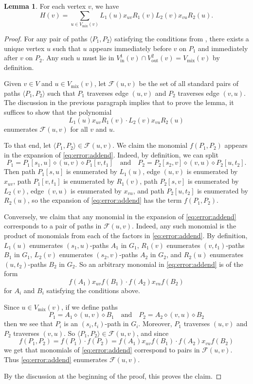 \documentclass[11pt]{article}
\newcommand{\grp}[1]{\left(#1\right)}
\newcommand{\pair}[1]{\langle #1\rangle}
\newcommand{\dia}{\diamond}
\newcommand{\ca}{\mathcal}
\renewcommand{\t}{\text}
\newcommand{\vin}{V_{\t{in}}}
\newcommand{\vout}{V_{\t{out}}}
\newcommand{\vmix}{V_{\t{mix}}}
\theoremstyle{definition}
\newtheorem{lemma}[theorem]{Lemma}
\begin{document}
\begin{lemma}
\label{lem:error-computation}
    For each vertex $v$, we have 
    \[H(v) = \sum_{u\in\vmix(v)} L_1(u)x_{uv}R_1(v)L_2(v)x_{vu}R_2(u).\]
\end{lemma}
\begin{proof}
For any pair of paths $\langle P_1,P_2\rangle$ satisfying the conditions from , there exists a unique vertex $u$ such that $u$ appears immediately before $v$ on $P_1$ and immediately after $v$ on $P_2$.
Any such $u$ must lie in $\vin^1(v)\cap \vout^2(v) = \vmix(v)$ by definition.

Given $v\in V$ and $u\in\vmix(v)$,
let $\ca{F}(u,v)$ be the set of all standard pairs of paths $\langle P_1,P_2\rangle$ such that $P_1$ traverses edge $(u,v)$ and $P_2$ traverses edge $(v,u)$.
The discussion in the previous paragraph implies that to prove the lemma, it suffices to show that the polynomial 
\begin{equation}
    \label{eq:error:addend}
    L_1(u)x_{uv}R_1(v)\cdot L_2(v)x_{vu}R_2(u)
\end{equation}
enumerates $\ca{F}(u,v)$ for all $v$ and $u$.

To that end, let $\pair{P_1,P_2}\in\ca{F}(u,v)$.
We claim the monomial $f(P_1,P_2)$ appears in the expansion of \cref{eq:error:addend}.
Indeed, by definition, we can split 
    \[P_1 = P_1[s_1,u]\dia (u,v)\dia P_1[v,t_1]\quad\text{and}\quad
    P_2 = P_2[s_2,v]\dia (v,u)\dia P_2[u,t_2].\]
Then path $P_1[s,u]$ is enumerated by $L_1(u)$, edge $(u,v)$ is enumerated by $x_{uv}$, path $P_1[v,t_1]$ is enumerated by $R_1(v)$, path $P_2[s,v]$ is enumerated by $L_2(v)$, edge $(v,u)$ is enumerated by $x_{vu}$, and path $P_2[u,t_2]$ is enumerated by $R_2(u)$, so the expansion of \cref{eq:error:addend} has the term $f(P_1,P_2)$.

Conversely, we claim that any monomial in the expansion of \cref{eq:error:addend} corresponds to a pair of paths in $\ca{F}(u,v)$.
Indeed, any such monomial is the product of monomials from each of the factors in \cref{eq:error:addend}.
By definition, $L_1(u)$ enumerates $(s_1,u)$-paths $A_1$ in $G_1$, $R_1(v)$ enumerates $(v,t_1)$-paths $B_1$ in $G_1$, $L_2(v)$ enumerates $(s_2,v)$-paths $A_2$ in $G_2$, and $R_2(u)$ enumerates $(u,t_2)$-paths $B_2$ in $G_2$.
So an arbitrary monomial in \cref{eq:error:addend} is of the form 
    \[f(A_1)x_{uv}f(B_1)\cdot f(A_2)x_{vu}f(B_2)\]
for $A_i$ and $B_i$ satisfying the conditions above.

Since $u\in\vmix(v)$, if we define paths 
    \[P_1 = A_1\dia (u,v)\dia B_1\quad\text{and}\quad P_2=A_2\dia (v,u)\dia B_2\]
then we see that $P_i$ is an $(s_i,t_i)$-path in $G_i$.
Moreover, $P_1$ traverses $(u,v)$ and $P_2$ traverses $(v,u)$.
So $\pair{P_1,P_2}\in\ca{F}(u,v)$, and since 
    \[f(P_1,P_2) = f(P_1)\cdot f(P_2) = f(A_1)x_{uv}f(B_1)\cdot f(A_2)x_{vu}f(B_2)\]
we get that monomials of \cref{eq:error:addend} correspond to pairs in $\ca{F}(u,v)$.
Thus \cref{eq:error:addend} enumerates $\ca{F}(u,v)$.

By the discussion at the beginning of the proof, this proves the claim.
\end{proof}
\end{document}
